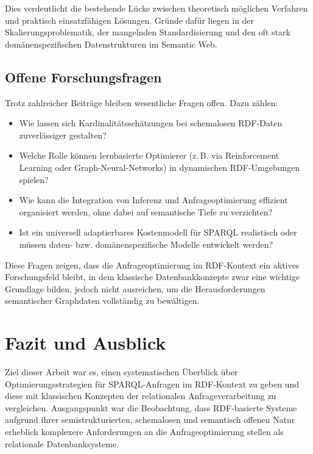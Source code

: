 \documentclass[12pt]{article}
\begin{document}
Dies verdeutlicht die bestehende Lücke zwischen theoretisch möglichen Verfahren und praktisch einsatzfähigen Lösungen. Gründe dafür liegen in der Skalierungsproblematik, der mangelnden Standardisierung und den oft stark domänenspezifischen Datenstrukturen im Semantic Web.

\subsection{Offene Forschungsfragen}

Trotz zahlreicher Beiträge bleiben wesentliche Fragen offen. Dazu zählen:
\begin{itemize}
    \item Wie lassen sich Kardinalitätsschätzungen bei schemalosen RDF-Daten zuverlässiger gestalten?
    \item Welche Rolle können lernbasierte Optimierer (z.\,B. via Reinforcement Learning oder Graph-Neural-Networks) in dynamischen RDF-Umgebungen spielen?
    \item Wie kann die Integration von Inferenz und Anfrageoptimierung effizient organisiert werden, ohne dabei auf semantische Tiefe zu verzichten?
    \item Ist ein universell adaptierbares Kostenmodell für SPARQL realistisch oder müssen daten- bzw. domänenspezifische Modelle entwickelt werden?
\end{itemize}

Diese Fragen zeigen, dass die Anfrageoptimierung im RDF-Kontext ein aktives Forschungsfeld bleibt, in dem klassische Datenbankkonzepte zwar eine wichtige Grundlage bilden, jedoch nicht ausreichen, um die Herausforderungen semantischer Graphdaten vollständig zu bewältigen.


\section{Fazit und Ausblick} \label{sec:fazit}

Ziel dieser Arbeit war es, einen systematischen Überblick über Optimierungsstrategien für SPARQL-Anfragen im RDF-Kontext zu geben und diese mit klassischen Konzepten der relationalen Anfrageverarbeitung zu vergleichen. Ausgangspunkt war die Beobachtung, dass RDF-basierte Systeme aufgrund ihrer semistrukturierten, schemalosen und semantisch offenen Natur erheblich komplexere Anforderungen an die Anfrageoptimierung stellen als relationale Datenbanksysteme.
\end{document}
